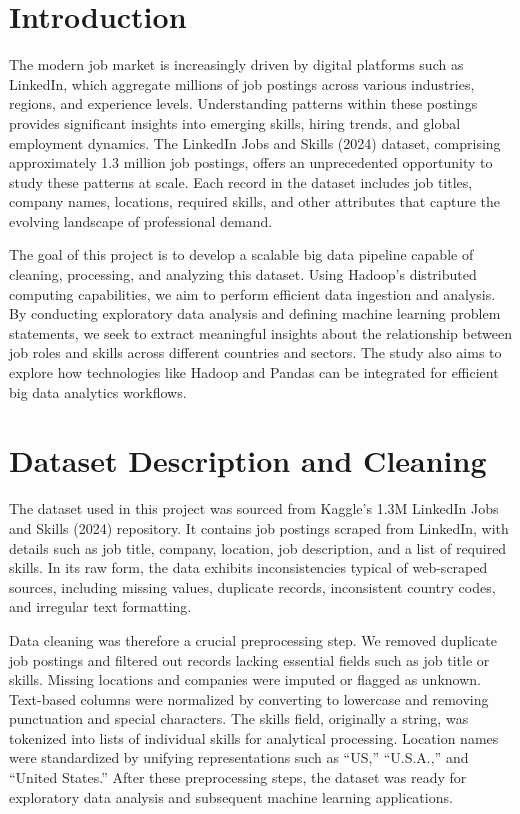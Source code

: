 \documentclass[conference]{IEEEtran}
\begin{document}
\section{Introduction}
The modern job market is increasingly driven by digital platforms such as LinkedIn, which aggregate millions of job postings across various industries, regions, and experience levels. Understanding patterns within these postings provides significant insights into emerging skills, hiring trends, and global employment dynamics. The LinkedIn Jobs and Skills (2024) dataset, comprising approximately 1.3 million job postings, offers an unprecedented opportunity to study these patterns at scale. Each record in the dataset includes job titles, company names, locations, required skills, and other attributes that capture the evolving landscape of professional demand.

The goal of this project is to develop a scalable big data pipeline capable of cleaning, processing, and analyzing this dataset. Using Hadoop’s distributed computing capabilities, we aim to perform efficient data ingestion and analysis. By conducting exploratory data analysis and defining machine learning problem statements, we seek to extract meaningful insights about the relationship between job roles and skills across different countries and sectors. The study also aims to explore how technologies like Hadoop and Pandas can be integrated for efficient big data analytics workflows.

\section{Dataset Description and Cleaning}
The dataset used in this project was sourced from Kaggle’s 1.3M LinkedIn Jobs and Skills (2024) repository. It contains job postings scraped from LinkedIn, with details such as job title, company, location, job description, and a list of required skills. In its raw form, the data exhibits inconsistencies typical of web-scraped sources, including missing values, duplicate records, inconsistent country codes, and irregular text formatting.

Data cleaning was therefore a crucial preprocessing step. We removed duplicate job postings and filtered out records lacking essential fields such as job title or skills. Missing locations and companies were imputed or flagged as unknown. Text-based columns were normalized by converting to lowercase and removing punctuation and special characters. The skills field, originally a string, was tokenized into lists of individual skills for analytical processing. Location names were standardized by unifying representations such as “US,” “U.S.A.,” and “United States.” After these preprocessing steps, the dataset was ready for exploratory data analysis and subsequent machine learning applications.
\end{document}
